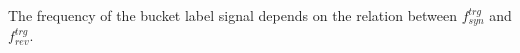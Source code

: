 %
%

 

The frequency of the bucket label signal depends on the relation between $f_{\mathit{syn}}^{\mathit{trg}}$ and $f_{\mathit{rev}}^{\mathit{trg}}$.

